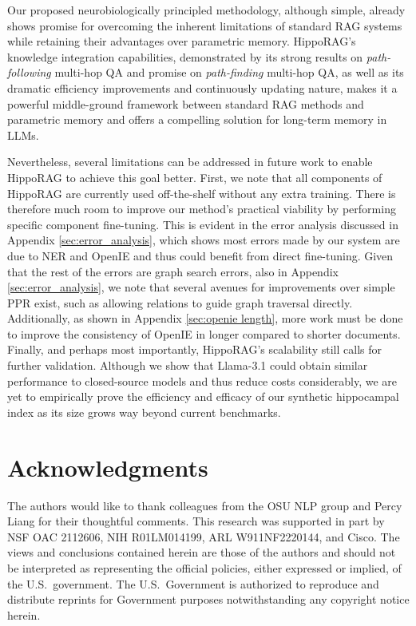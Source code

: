 \documentclass{article}
\begin{document}
Our proposed neurobiologically principled methodology, although simple, already shows promise for overcoming the inherent limitations of standard RAG systems while retaining their advantages over parametric memory.
HippoRAG's knowledge integration capabilities, demonstrated by its strong results on \textit{path-following} multi-hop QA and promise on \textit{path-finding} multi-hop QA, as well as its dramatic efficiency improvements and continuously updating nature, makes it a powerful middle-ground framework between standard RAG methods and parametric memory and offers a compelling solution for long-term memory in LLMs.

Nevertheless, several limitations can be addressed in future work to enable HippoRAG to achieve this goal better. 
First, we note that all components of HippoRAG are currently used off-the-shelf without any extra training.
There is therefore much room to improve our method's practical viability by performing specific component fine-tuning. 
This is evident in the error analysis discussed in Appendix \ref{sec:error_analysis}, which shows most errors made by our system are due to NER and OpenIE and thus could benefit from direct fine-tuning.
Given that the rest of the errors are graph search errors, also in Appendix \ref{sec:error_analysis}, we note that several avenues for improvements over simple PPR exist, such as allowing relations to guide graph traversal directly.
Additionally, as shown in Appendix \ref{sec:openie length}, more work must be done to improve the consistency of OpenIE in longer compared to shorter documents.
Finally, and perhaps most importantly, HippoRAG's scalability still calls for further validation.
Although we show that Llama-3.1 could obtain similar performance to closed-source models and thus reduce costs considerably, we are yet to empirically prove the efficiency and efficacy of our synthetic hippocampal index as its size grows way beyond current benchmarks.

\section*{Acknowledgments}
The authors would like to thank colleagues from the OSU NLP group and Percy Liang for their thoughtful comments. This research was supported in part by NSF OAC 2112606, NIH R01LM014199, ARL W911NF2220144, and Cisco. The views and conclusions contained herein are those of the authors and should not be interpreted as representing the official policies, either expressed or implied, of the U.S.\ government. The U.S.\ Government is authorized to reproduce and distribute reprints for Government purposes notwithstanding any copyright notice herein.
\end{document}
